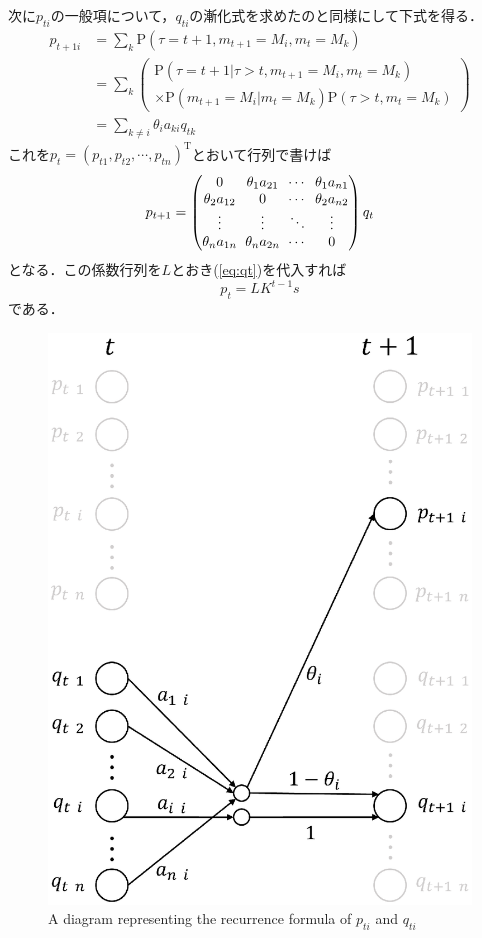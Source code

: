 次に$ p_{t i} $の一般項について，$ q_{t i} $の漸化式を求めたのと同様にして下式を得る．
\begin{align*}
    p_{t+1 i} & = \! \sum_{k} \mathrm{P}(\tau = t + 1 , m_{t+1} = M_i , m_t = M_k) \\
    & = \! \sum_{k} \left(
        \begin{array}{l}
            \mathrm{P}(\tau \! = \! t + 1 | \tau \! > \! t , m_{t+1} \! = \! M_i , m_t \! = \! M_k) \\
            \times \mathrm{P}(m_{t+1} \! = \! M_i | m_t \! = \! M_k) \mathrm{P}(\tau \! > \! t , m_t \! = \! M_k)
        \end{array}
    \right) \\
    & = \! \sum_{k \ne i} \theta_i a_{k i} q_{t k}
\end{align*}
これを$ p_t = (p_{t 1} , p_{t 2} , \cdots , p_{t n})^\mathrm{T} $とおいて行列で書けば
\begin{equation*}
    \arraycolsep3pt
    p_{t + 1} = 
    \begin{pmatrix}
        0 & \theta_1 a_{2 1} & \cdots & \theta_1 a_{n 1} \\
        \theta_2 a_{1 2} & 0 & \cdots & \theta_2 a_{n 2} \\
        \vdots & \vdots & \ddots & \vdots \\
        \theta_n a_{1 n} & \theta_n a_{2 n} & \cdots & 0 \\
    \end{pmatrix}
    q_t
\end{equation*}
となる．この係数行列を$ L $とおき(\ref{eq:qt})を代入すれば
\begin{equation} \label{eq:pt}
    p_t = L K^{t - 1} s
\end{equation}
である．

\begin{figure}[bt]
    \centering
    \includegraphics[keepaspectratio, width=0.7\linewidth]{figs/pq.eps}
    \caption{A diagram representing the recurrence formula of $ p_{t i} $ and $ q_{t i} $}
\end{figure}


